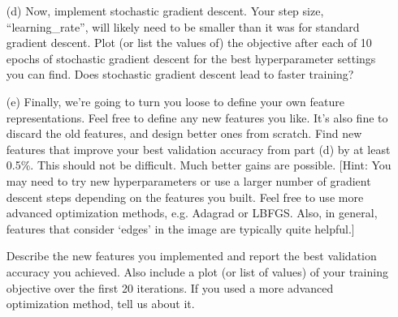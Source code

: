 \documentclass[10pt]{report}
\begin{document}
\begin{enumerate}
\begin{enumerate}
\item[(d)] Now, implement stochastic gradient descent. Your step size, ``learning\_rate'', will likely need to be smaller than it was for standard gradient descent. Plot (or list the values of) the objective after each of 10 epochs of stochastic gradient descent for the best hyperparameter settings you can find. Does stochastic gradient descent lead to faster training? 
\begin{solution}

\end{solution}

\item[(e)] Finally, we're going to turn you loose to define your own feature representations. Feel free to define any new features you like. It's also fine to discard the old features, and design better ones from scratch. Find new features that improve your best validation accuracy from part (d) by at least 0.5\%. This should not be difficult. Much better gains are possible. [Hint: You may need to try new hyperparameters or use a larger number of gradient descent steps depending on the features you built. Feel free to use more advanced optimization methods, e.g. Adagrad or LBFGS. Also, in general, features that consider `edges' in the image are typically quite helpful.]

\vspace{0.5em}
Describe the new features you implemented and report the best validation accuracy you achieved. Also include a plot (or list of values) of your training objective over the first 20 iterations. If you used a more advanced optimization method, tell us about it.
\begin{solution}

\end{solution}


\end{enumerate}
\end{enumerate}
\end{document}
